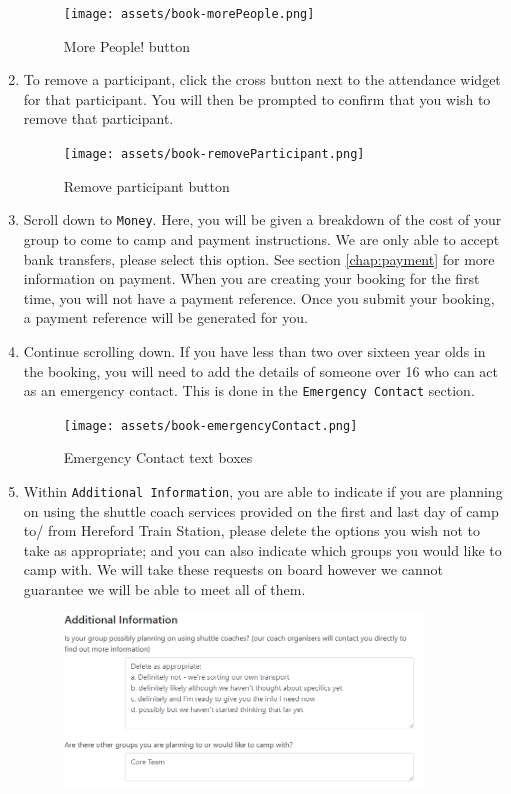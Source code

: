 \begin{enumerate}
    \begin{figure}[H]
        \centering
        \texttt{[image: assets/book-morePeople.png]}
        \caption{More People! button}
    \end{figure}
    \item To remove a participant, click the cross button next to the attendance widget for that participant. You will then be prompted to confirm that you wish to remove that participant.
    \begin{figure}[H]
        \centering
        \texttt{[image: assets/book-removeParticipant.png]}
        \caption{Remove participant button}
    \end{figure}
    \item Scroll down to \verb|Money|. Here, you will be given a breakdown of the cost of your group to come to camp and payment instructions. We are only able to accept bank transfers, please select this option. See section \ref*{chap:payment} for more information on payment. When you are creating your booking for the first time, you will not have a payment reference. Once you submit your booking, a payment reference will be generated for you. 
    \item Continue scrolling down. If you have less than two over sixteen year olds in the booking, you will need to add the details of someone over 16 who can act as an emergency contact. This is done in the \verb|Emergency Contact| section. 
    \begin{figure}[H]
        \centering
        \texttt{[image: assets/book-emergencyContact.png]}
        \caption{Emergency Contact text boxes}
    \end{figure}
    \item Within \verb|Additional Information|, you are able to indicate if you are planning on using the shuttle coach services provided on the first and last day of camp to/ from Hereford Train Station, please delete the options you wish not to take as appropriate; and you can also indicate which groups you would like to camp with. We will take these requests on board however we cannot guarantee we will be able to meet all of them.
    \begin{figure}[H]
        \centering
        \includegraphics[width=0.9\textwidth]{assets/book-additionalInfo.png}

\end{figure}
\end{enumerate}
